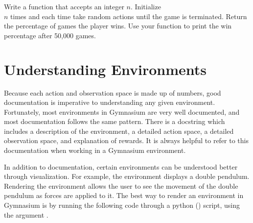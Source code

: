 \begin{problem}
Write a function  that accepts an integer $n$.
Initialize \\  $n$ times and each time take random actions until the game is terminated.
Return the percentage of games the player wins.
Use your function to print the win percentage after 50,000 games.
\label{prob:random-blackjack}
\end{problem}

\section*{Understanding Environments}
Because each action and observation space is made up of numbers, good documentation is imperative to understanding any given environment.
Fortunately, most environments in Gymnasium are very well documented, and most documentation follows the same pattern.
There is a docstring which includes a description of the environment, a detailed action space, a detailed observation space, and explanation of rewards.
It is always helpful to refer to this documentation when working in a Gymnasium environment.

In addition to documentation, certain environments can be understood better through visualization.
For example, the environment  displays a double pendulum.
Rendering the environment allows the user to see the movement of the double pendulum as forces are applied to it.
The best way to render an environment in Gymnasium is by running the following code through a python () script, using the argument .

